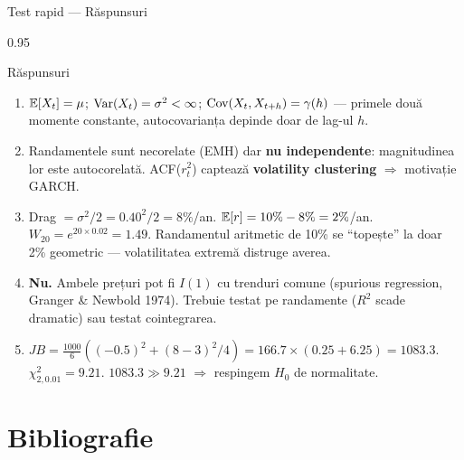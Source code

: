 \documentclass[9pt, aspectratio=169, t]{beamer}
\begin{document}
\begin{frame}[shrink=5]{Test rapid --- Răspunsuri}
    \begin{cminipage}{0.95\textwidth}
    \begin{exampleblock}{Răspunsuri}
    \begin{enumerate}\setlength{\itemsep}{0pt}
        \item $\mathbb{E}[X_t] = \mu$; \; $\text{Var}(X_t) = \sigma^2 < \infty$; \; $\text{Cov}(X_t, X_{t+h}) = \gamma(h)$ --- primele două momente constante, autocovarianța depinde doar de lag-ul $h$.
        \vspace{0.05cm}
        \item Randamentele sunt necorelate (EMH) dar \textbf{nu independente}: magnitudinea lor este autocorelată. ACF($r_t^2$) captează \textbf{volatility clustering} $\Rightarrow$ motivație GARCH.
        \vspace{0.05cm}
        \item Drag $= \sigma^2/2 = 0.40^2/2 = 8\%$/an. $\mathbb{E}[r] = 10\% - 8\% = 2\%$/an. $W_{20} = e^{20 \times 0.02} = 1.49$. Randamentul aritmetic de 10\% se ``topește'' la doar 2\% geometric --- volatilitatea extremă distruge averea.
        \vspace{0.05cm}
        \item \textbf{Nu.} Ambele prețuri pot fi $I(1)$ cu trenduri comune (spurious regression, Granger \& Newbold 1974). Trebuie testat pe randamente ($R^2$ scade dramatic) sau testat cointegrarea.
        \vspace{0.05cm}
        \item $JB = \frac{1000}{6}((-0.5)^2 + (8-3)^2/4) = 166.7 \times (0.25 + 6.25) = \mathbf{1083.3}$. $\chi^2_{2, 0.01} = 9.21$. $1083.3 \gg 9.21$ $\Rightarrow$ respingem $H_0$ de normalitate.
    \end{enumerate}
    \end{exampleblock}
    \end{cminipage}
\end{frame}

\section{Bibliografie}
\end{document}
